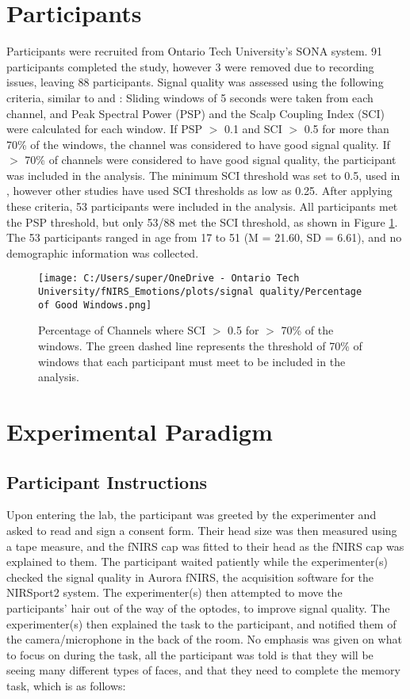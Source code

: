 \section{Participants}
Participants were recruited from Ontario Tech University's SONA system. 
91 participants completed the study, however 3 were removed due to recording issues, leaving 88 participants.
Signal quality was assessed using the following criteria, similar to \citep{bulgarelli_growth_2025} and \citep{hernandez_nirsplot_2020}: 
Sliding windows of 5 seconds were taken from each channel, and Peak Spectral Power (PSP) and the Scalp Coupling Index (SCI) \citep{pollonini_phoebe_2016} were calculated for each window.
If PSP $>$ 0.1 and SCI $>$ 0.5 for more than 70\% of the windows, the channel was considered to have good signal quality.
If $>$ 70\% of channels were considered to have good signal quality, the participant was included in the analysis.
The minimum SCI threshold was set to 0.5, used in \citep{holmes_opening_2024}, however other studies have used SCI thresholds as low as 0.25\citep{zhou_autistic_2024}. 
After applying these criteria, 53 participants were included in the analysis. 
All participants met the PSP threshold, but only 53/88 met the SCI threshold, as shown in Figure \ref{fig:signal_quality}.
The 53 participants ranged in age from 17 to 51 (M = 21.60, SD = 6.61), and no demographic information was collected. 

\begin{figure}[H]
    \centering
    \texttt{[image: C:/Users/super/OneDrive - Ontario Tech University/fNIRS\_Emotions/plots/signal quality/Percentage of Good Windows.png]}
    \caption{Percentage of Channels where SCI $>$ 0.5 for $>$ 70\% of the windows.
    The green dashed line represents the threshold of 70\% of windows that each participant must meet to be included in the analysis.}
    \label{fig:signal_quality}
\end{figure}

\section{Experimental Paradigm}
\subsection{Participant Instructions}
Upon entering the lab, the participant was greeted by the experimenter and asked to read and sign a consent form. 
Their head size was then measured using a tape measure, and the fNIRS cap was fitted to their head as the fNIRS cap was explained to them.
The participant waited patiently while the experimenter(s) checked the signal quality in Aurora fNIRS, the acquisition software for the NIRSport2 system.
The experimenter(s) then attempted to move the participants' hair out of the way of the optodes, to improve signal quality.
The experimenter(s) then explained the task to the participant, and notified them of the camera/microphone in the back of the room. 
No emphasis was given on what to focus on during the task, all the participant was told is that they will be seeing many different types of faces, and that they need to complete the memory task, which is as follows:

